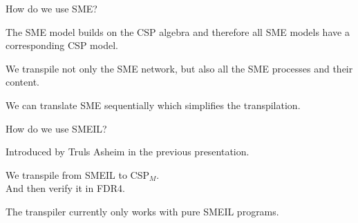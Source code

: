 \documentclass[13pt]{beamer}
\newcommand{\cspm}{CSP$_M$}
\begin{document}
%
\begin{frame}{How do we use SME?}
 \begin{block}{}
   The SME model builds on the CSP algebra and therefore all SME models have a corresponding CSP model.

 \end{block}

 \pause

  \begin{block}{}
    We transpile not only the SME network, but also all the SME processes and their content.
  \end{block}

 \pause

  \begin{block}{}
    We can translate SME sequentially which simplifies the transpilation.
  \end{block}
\end{frame}
%
\begin{frame}{How do we use SMEIL?}
 \begin{block}{}
    Introduced by Truls Asheim in the previous presentation.
 \end{block}

 \pause

 \begin{block}{}
   We transpile from SMEIL to \cspm{}.\\
   And then verify it in FDR4.
 \end{block}

 \pause

 \begin{block}{}
   The transpiler currently only works with pure SMEIL programs.
 \end{block}
\end{frame}
%
\end{document}
